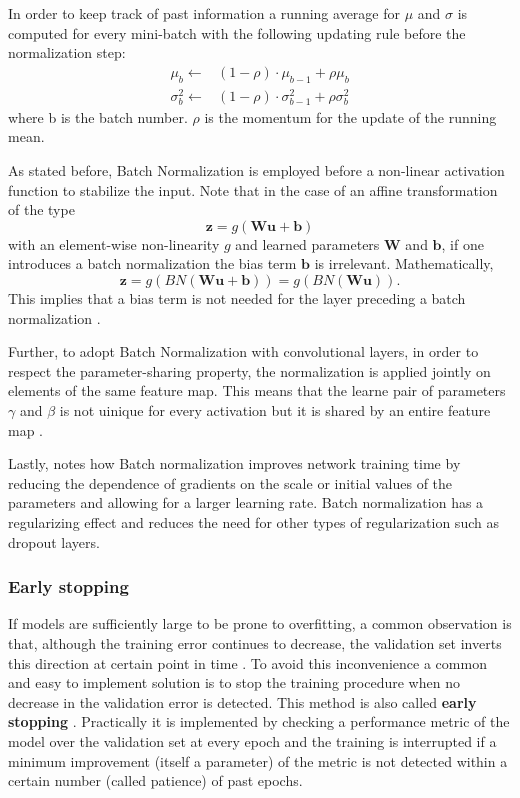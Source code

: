 In order to keep track of past information a running average for $\mu$ and $\sigma$ is computed for every mini-batch with the following updating rule \citep{Ioffe2015BatchShift} before the normalization step: 
\begin{align}
    \mu_b \leftarrow & (1 - \rho) \cdot \mu_{b-1} + \rho\mu_b \\
    \sigma_b^2 \leftarrow & (1 - \rho) \cdot \sigma_{b-1}^2 + \rho\sigma_b^2
\end{align}
where b is the batch number. $\rho$ is the momentum for the update of the running mean.

As stated before, Batch Normalization is employed before a non-linear activation function to stabilize the input. Note that in the case of an affine transformation of the type
\begin{equation}
    \bm{z} = g(\bm{W}\bm{u}+\bm{b})
\end{equation}
with an element-wise non-linearity $g$ and learned parameters $\bm{W}$ and $\bm{b}$, if one introduces a batch normalization the bias term $\bm{b}$ is irrelevant. Mathematically,
\begin{equation}
    \bm{z} = g(BN(\bm{W}\bm{u}+\bm{b})) = g(BN(\bm{W}\bm{u})).
\end{equation}
This implies that a bias term is not needed for the layer preceding a batch normalization \citep{Ioffe2015BatchShift}.

Further, to adopt Batch Normalization with convolutional layers, in order to respect the parameter-sharing property, the normalization is applied jointly on elements of the same feature map. This means that the learne pair of parameters $\gamma$ and $\beta$ is not uinique for every activation but it is shared by an entire feature map \citep{Ioffe2015BatchShift}. 

Lastly, \citet{Ioffe2015BatchShift} notes how Batch normalization improves network training time by reducing the dependence of gradients on the scale or initial values of the parameters and allowing for a larger learning rate. Batch normalization has a regularizing effect and reduces the need for other types of regularization such as dropout layers.

\subsubsection{Early stopping}
If models are sufficiently large to be prone to overfitting, a common observation is that, although the training error continues to decrease, the validation set inverts this direction at certain point in time \citep{Goodfellow2016}. To avoid this inconvenience a common and easy to implement solution is to stop the training procedure when no decrease in the validation error is detected. This method is also called \textbf{early stopping} \citep{Prechelt1998EarlyWhen}. Practically it is implemented by checking a performance metric of the model over the validation set at every epoch and the training is interrupted if a minimum improvement (itself a parameter) of the metric is not detected within a certain number (called patience) of past epochs.


